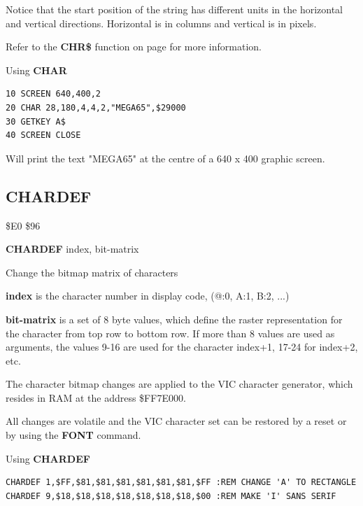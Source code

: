 \begin{description}[leftmargin=2cm,style=nextline]
                Notice that the start position of the string has
                different units in the horizontal and vertical directions.
                Horizontal is in columns and vertical is in pixels.

                Refer to the {\bf CHR\$} function on page \pageref{chrcommand}
                for more information.

\item [Example:] Using {\bf CHAR}
\begin{tcolorbox}[colback=black,coltext=white]
\verbatimfont{\codefont}
\begin{verbatim}
10 SCREEN 640,400,2
20 CHAR 28,180,4,4,2,"MEGA65",$29000
30 GETKEY A$
40 SCREEN CLOSE
\end{verbatim}
\end{tcolorbox}
Will print the text "MEGA65" at the centre of a 640 x 400 graphic screen.
\end{description}


\newpage
\subsection{CHARDEF}
\begin{description}[leftmargin=2cm,style=nextline]
\item [Token:] \$E0 \$96
\item [Format:] {\bf CHARDEF} index, bit-matrix
\item [Usage:] Change the bitmap matrix of characters

      {\bf index} is the character number in display code,
      (@:0, A:1, B:2, ...)

      {\bf bit-matrix} is a set of 8 byte values, which define
      the raster representation for the character from top row to bottom row.
      If more than 8 values are used as arguments, the values 9-16 are used
      for the character index+1, 17-24 for index+2, etc.

\item [Remarks:] The character bitmap changes are applied to the VIC
       character generator, which resides in RAM at the address \$FF7E000.

       All changes are volatile and the VIC character set can be restored by
       a reset or by using the {\bf FONT} command.

\item [Examples:] Using {\bf CHARDEF}
\begin{tcolorbox}[colback=black,coltext=white]
\verbatimfont{\codefont}
\begin{verbatim}
CHARDEF 1,$FF,$81,$81,$81,$81,$81,$81,$FF :REM CHANGE 'A' TO RECTANGLE
CHARDEF 9,$18,$18,$18,$18,$18,$18,$18,$00 :REM MAKE 'I' SANS SERIF
\end{verbatim}
\end{tcolorbox}
\end{description}

